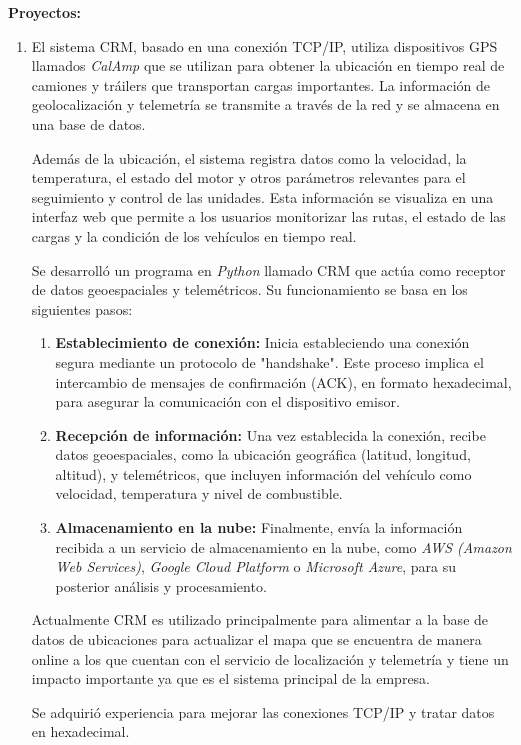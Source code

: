 \documentclass[protocolo.tex]{subfiles}
\begin{document}
\textbf{Proyectos:}
\begin{enumerate}
\item El sistema CRM, basado en una conexión TCP/IP, utiliza dispositivos GPS llamados \textit{CalAmp} que se utilizan para obtener la ubicación en tiempo real de camiones y tráilers que transportan cargas importantes. La información de geolocalización y telemetría se transmite a través de la red y se almacena en una base de datos.

Además de la ubicación, el sistema registra datos como la velocidad, la temperatura, el estado del motor y otros parámetros relevantes para el seguimiento y control de las unidades. Esta información se visualiza en una interfaz web que permite a los usuarios monitorizar las rutas, el estado de las cargas y la condición de los vehículos en tiempo real.

Se desarrolló un programa en \textit{Python} llamado CRM que actúa como receptor de datos geoespaciales y telemétricos. Su funcionamiento se basa en los siguientes pasos:
\begin{enumerate}
    \item \textbf{Establecimiento de conexión:}  Inicia estableciendo una conexión segura mediante un protocolo de "handshake". Este proceso implica el intercambio de mensajes de confirmación (ACK), en formato hexadecimal, para asegurar la comunicación con el dispositivo emisor.
    \item \textbf{Recepción de información:} Una vez establecida la conexión,  recibe datos geoespaciales, como la ubicación geográfica (latitud, longitud, altitud), y telemétricos, que incluyen información del vehículo como velocidad, temperatura y nivel de combustible.
    \item \textbf{Almacenamiento en la nube:} Finalmente, envía la información recibida a un servicio de almacenamiento en la nube, como  \textit{AWS (Amazon Web Services)}, \textit{Google Cloud Platform} o \textit{Microsoft Azure}, para su posterior análisis y procesamiento.
\end{enumerate}


Actualmente CRM es utilizado principalmente para alimentar a la base de datos de
ubicaciones para actualizar el mapa que se encuentra de manera online a los que cuentan
con el servicio de localización y telemetría y tiene un impacto importante ya que es el
sistema principal de la empresa.


Se adquirió experiencia para mejorar las conexiones TCP/IP y tratar datos en hexadecimal.



\end{enumerate}
\end{document}
